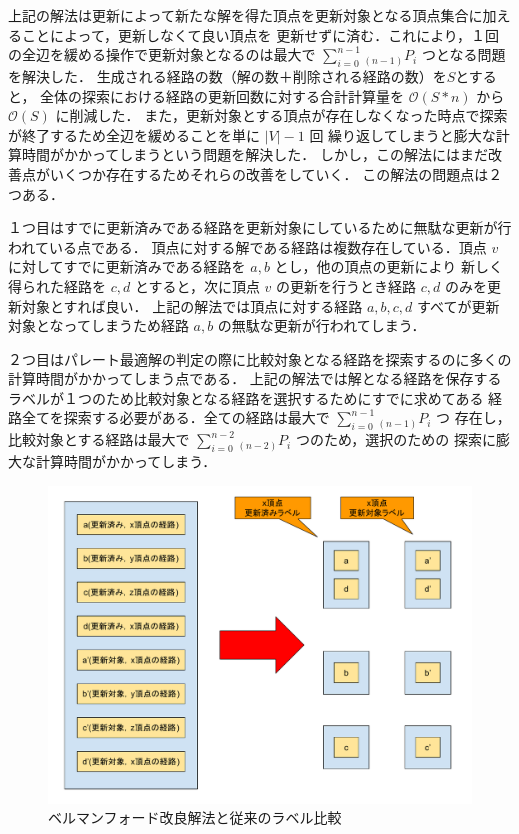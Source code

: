 \documentclass[12pt]{optlab-bachelor}
\begin{document}
上記の解法は更新によって新たな解を得た頂点を更新対象となる頂点集合に加えることによって，更新しなくて良い頂点を
更新せずに済む．これにより，１回の全辺を緩める操作で更新対象となるのは最大で
$\displaystyle \sum_{i=0}^{n-1} {}_{(n-1)}P_i$ つとなる問題を解決した．
生成される経路の数（解の数＋削除される経路の数）を$S$とすると，
全体の探索における経路の更新回数に対する合計計算量を $\mathcal{O}(S*n)$ から $\mathcal{O}(S)$ に削減した．
また，更新対象とする頂点が存在しなくなった時点で探索が終了するため全辺を緩めることを単に $|V|-1$ 回
繰り返してしまうと膨大な計算時間がかかってしまうという問題を解決した．
しかし，この解法にはまだ改善点がいくつか存在するためそれらの改善をしていく．
この解法の問題点は２つある．

１つ目はすでに更新済みである経路を更新対象にしているために無駄な更新が行われている点である．
頂点に対する解である経路は複数存在している．頂点 $v$ に対してすでに更新済みである経路を $a,b$ とし，他の頂点の更新により
新しく得られた経路を $c,d$ とすると，次に頂点 $v$ の更新を行うとき経路 $c,d$ のみを更新対象とすれば良い．
上記の解法では頂点に対する経路 $a,b,c,d$ すべてが更新対象となってしまうため経路 $a,b$ の無駄な更新が行われてしまう．

２つ目はパレート最適解の判定の際に比較対象となる経路を探索するのに多くの計算時間がかかってしまう点である．
上記の解法では解となる経路を保存するラベルが１つのため比較対象となる経路を選択するためにすでに求めてある
経路全てを探索する必要がある．全ての経路は最大で $\displaystyle \sum_{i=0}^{n-1} {}_{(n-1)}P_i$ つ
存在し，比較対象とする経路は最大で $\displaystyle \sum_{i=0}^{n-2} {}_{(n-2)}P_i$ つのため，選択のための
探索に膨大な計算時間がかかってしまう．

\begin{figure}[htbp]
  \centering
  \caption{ベルマンフォード改良解法と従来のラベル比較}
  \includegraphics[width=12.0cm]{fig/fig3.pdf}
\end{figure}
\end{document}

